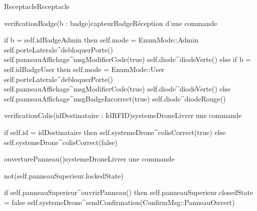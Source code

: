 \begin{OM}{Receptacle}{Receptacle}
    \begin{OMOperation}{verificationBadge(b : badge)}{capteurBadge}{Réception d'une commande}
        \begin{OMMessages}
        \end{OMMessages}
        \OMNoPre
        \begin{OMPost}
            if b = self.idBadgeAdmin then
            self.mode = EnumMode::Admin
            self.porteLaterale^debloquerPorte()
            self.panneauAffichage^msgModifierCode(true)
            self.diode^diodeVerte()
            else if b = self.idBadgeUser then
            self.mode = EnumMode::User
            self.porteLaterale^debloquerPorte()
            self.panneauAffichage^msgModifierCode(true)
            self.diode^diodeVerte()
            else
            self.panneauAffichage^msgBadgeIncorrect(true)
            self.diode^diodeRouge()
        \end{OMPost}
    \end{OMOperation}

    \begin{OMOperation}{verificationColis(idDestinataire : IdRFID)}{systemeDrone}{Livrer une commande}
        \begin{OMMessages}
        \end{OMMessages}
        \OMNoPre
        \begin{OMPost}
            if self.id = idDestinataire then
            self.systemeDrone^colisCorrect(true)
            else
            self.systemeDrone^colisCorrect(false)
        \end{OMPost}
    \end{OMOperation}

    \begin{OMOperation}{ouverturePanneau()}{systemeDrone}{Livrer une commande}
        \begin{OMMessages}
        \end{OMMessages}
        \begin{OMPre}
            not(self.panneauSuperieur.lockedState)
        \end{OMPre}
        \begin{OMPost}
            if self.panneauSuperieur^ouvrirPanneau() then
            self.panneauSuperieur.closedState = false
            self.systemeDrone^sendConfirmation(ConfirmMsg::PanneauOuvert)
        \end{OMPost}
    \end{OMOperation}


\end{OM}
